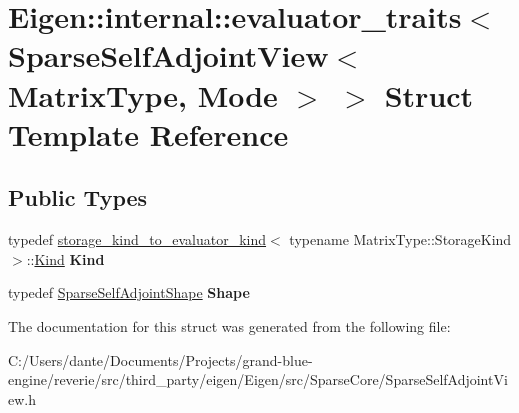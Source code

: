 \hypertarget{struct_eigen_1_1internal_1_1evaluator__traits_3_01_sparse_self_adjoint_view_3_01_matrix_type_00_01_mode_01_4_01_4}{}\section{Eigen\+::internal\+::evaluator\+\_\+traits$<$ Sparse\+Self\+Adjoint\+View$<$ Matrix\+Type, Mode $>$ $>$ Struct Template Reference}
\label{struct_eigen_1_1internal_1_1evaluator__traits_3_01_sparse_self_adjoint_view_3_01_matrix_type_00_01_mode_01_4_01_4}
\subsection*{Public Types}
\begin{DoxyCompactItemize}
\item 
\mbox{\label{struct_eigen_1_1internal_1_1evaluator__traits_3_01_sparse_self_adjoint_view_3_01_matrix_type_00_01_mode_01_4_01_4_a592360549f5868c1ebae4b6263b6fdf6}} 
typedef \mbox{\hyperlink{struct_eigen_1_1internal_1_1storage__kind__to__evaluator__kind}{storage\+\_\+kind\+\_\+to\+\_\+evaluator\+\_\+kind}}$<$ typename Matrix\+Type\+::\+Storage\+Kind $>$\+::\mbox{\hyperlink{struct_eigen_1_1internal_1_1_index_based}{Kind}} {\bfseries Kind}
\item 
\mbox{\label{struct_eigen_1_1internal_1_1evaluator__traits_3_01_sparse_self_adjoint_view_3_01_matrix_type_00_01_mode_01_4_01_4_a86d787406dd4237d16ffb6d88397cde7}} 
typedef \mbox{\hyperlink{struct_eigen_1_1internal_1_1_sparse_self_adjoint_shape}{Sparse\+Self\+Adjoint\+Shape}} {\bfseries Shape}
\end{DoxyCompactItemize}


The documentation for this struct was generated from the following file\+:\begin{DoxyCompactItemize}
\item 
C\+:/\+Users/dante/\+Documents/\+Projects/grand-\/blue-\/engine/reverie/src/third\+\_\+party/eigen/\+Eigen/src/\+Sparse\+Core/Sparse\+Self\+Adjoint\+View.\+h\end{DoxyCompactItemize}

